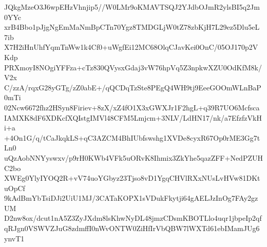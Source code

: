 JQkgMzeO3J6wpEHzVhnjip5//W0LMr9oKMAVTSQJ2YJdbOJmR2ylsBI5q2Jm0YYc
xrB4Bbo1pJjgNgEmMaNmBpCTn70Ygz8TMDGLjW0tZ78zbKjH7L29ez5Dlu5eL7ib
X7H2iHnUhfYqmTnWw1k4Cf0+uWgfEi12MC68OlqCJavKei0OnC/05OJ170p2VKdp
PRXmoyI8NOgiYFFza+cTz830QVysxGdaj3vW76hpVq5Z3npkwXZU0OdKfM8k/V2x
C/zzA/rqxG28yGTg/zZ0abE+/qQCDqTzSte8PEgQ4WH9tj9EeeGOOmWLnBaP0mTi
02Ncw6672fhz2HSyn8Firiev+8zX/xZ4fO1X3xGWXJr1F2hgL+q39R7UO6Mcfsca
IAMXK8dF6XDKcfXQIstgIMVl48CFM5Lmjcm+3NLV/LdHN17/nk/a7EfzfzVkHi+a
+4On1G/q/tCaJkqkLS+qC3AZCM4BhIUbfswshg1XVDe8cyxR67Op0rME3Gg7tLn0
uQzAobNNYyswxv/p9rH0KWb4VFk5uORvK8Ihmix3ZkYhe5qazZFF+NedPZUHC2bo
XWEg0YlyIYOQ2R+vV74uoYGbyz23Tjso8vD1YgqCHVlRXxNUsLvHVw81DKtuOpCf
9kAdBmYbTsiDJi2UiU1MJ/3CATaKOPX1sVDukFkytji64gAELJzInOg7FAy2gzUM
D2nw8ox/dcut1nA5Z3ZyJXdm8lsKhwNyDL48jmzCDsmKBOTLlo4uqr1jbpeIp2qf
qRJgn0VSWVZJuG8zdmffI0nWvONTW0ZiHfIrVbQBW7lWXTd61ebIMamJUg6ynvT1
